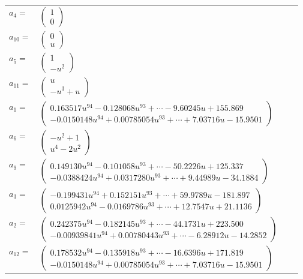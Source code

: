 \documentclass[1p]{elsarticle_modified}
\theoremstyle{definition}
\begin{document}
\begin{tabular}{m{7pt} m{180pt} m{7pt} m{180pt} }
\flushright $a_{4}=$&$\begin{pmatrix}1\\0\end{pmatrix}$ \\
\flushright $a_{10}=$&$\begin{pmatrix}0\\u\end{pmatrix}$ \\
\flushright $a_{5}=$&$\begin{pmatrix}1\\- u^2\end{pmatrix}$ \\
\flushright $a_{11}=$&$\begin{pmatrix}u\\- u^3+u\end{pmatrix}$ \\
\flushright $a_{1}=$&$\begin{pmatrix}0.163517 u^{94}-0.128068 u^{93}+\cdots-9.60245 u+155.869\\-0.0150148 u^{94}+0.00785054 u^{93}+\cdots+7.03716 u-15.9501\end{pmatrix}$ \\
\flushright $a_{6}=$&$\begin{pmatrix}- u^2+1\\u^4-2 u^2\end{pmatrix}$ \\
\flushright $a_{9}=$&$\begin{pmatrix}0.149130 u^{94}-0.101058 u^{93}+\cdots-50.2226 u+125.337\\-0.0388424 u^{94}+0.0317280 u^{93}+\cdots+9.44989 u-34.1884\end{pmatrix}$ \\
\flushright $a_{3}=$&$\begin{pmatrix}-0.199431 u^{94}+0.152151 u^{93}+\cdots+59.9789 u-181.897\\0.0125942 u^{94}-0.0169786 u^{93}+\cdots+12.7547 u+21.1136\end{pmatrix}$ \\
\flushright $a_{2}=$&$\begin{pmatrix}0.242375 u^{94}-0.182145 u^{93}+\cdots-44.1731 u+223.500\\-0.00939841 u^{94}+0.00780443 u^{93}+\cdots-6.28912 u-14.2852\end{pmatrix}$ \\
\flushright $a_{12}=$&$\begin{pmatrix}0.178532 u^{94}-0.135918 u^{93}+\cdots-16.6396 u+171.819\\-0.0150148 u^{94}+0.00785054 u^{93}+\cdots+7.03716 u-15.9501\end{pmatrix}$ \\

\end{tabular}
\end{document}
